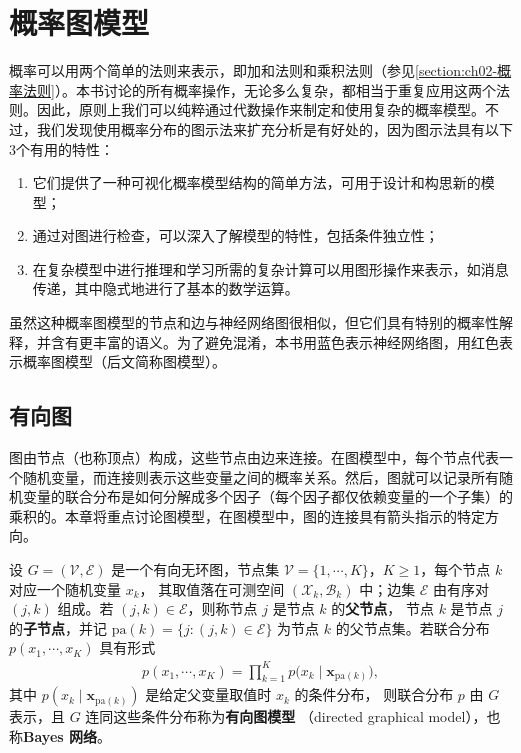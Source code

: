 \documentclass[../../main.tex]{subfiles}
\begin{document}
\section{概率图模型}\label{section:ch11-概率图模型}

概率可以用两个简单的法则来表示，即加和法则和乘积法则（参见\cref{section:ch02-概率法则}）。本书讨论的所有概率操作，无论多么复杂，都相当于重复应用这两个法则。因此，原则上我们可以纯粹通过代数操作来制定和使用复杂的概率模型。不过，我们发现使用概率分布的图示法来扩充分析是有好处的，因为图示法具有以下3个有用的特性：

\begin{enumerate}[(1)]
  \item 它们提供了一种可视化概率模型结构的简单方法，可用于设计和构思新的模型；
  \item 通过对图进行检查，可以深入了解模型的特性，包括条件独立性；
  \item 在复杂模型中进行推理和学习所需的复杂计算可以用图形操作来表示，如消息传递，其中隐式地进行了基本的数学运算。
\end{enumerate}

虽然这种概率图模型的节点和边与神经网络图很相似，但它们具有特别的概率性解释，并含有更丰富的语义。为了避免混淆，本书用蓝色表示神经网络图，用红色表示概率图模型（后文简称图模型）。

\subsection{有向图}\label{subsection:ch11-有向图}

图由节点（也称顶点）构成，这些节点由边来连接。在图模型中，每个节点代表一个随机变量，而连接则表示这些变量之间的概率关系。然后，图就可以记录所有随机变量的联合分布是如何分解成多个因子（每个因子都仅依赖变量的一个子集）的乘积的。本章将重点讨论图模型，在图模型中，图的连接具有箭头指示的特定方向。

\begin{definition}[有向图模型]\label{definition:ch11-有向图模型}
设 $G=(\mathcal{V},\mathcal{E})$ 是一个有向无环图，节点集
$\mathcal{V}=\{1,\cdots,K\}$，$K\geqslant1$，每个节点 $k$ 对应一个随机变量 $x_k$，
其取值落在可测空间 $(\mathcal{X}_k,\mathcal{B}_k)$ 中；边集 $\mathcal{E}$ 由有序对
$(j,k)$ 组成。若 $(j,k)\in\mathcal{E}$，则称节点 $j$ 是节点 $k$ 的\textbf{父节点}，
节点 $k$ 是节点 $j$ 的\textbf{子节点}，并记
$\mathrm{pa}(k)=\{j:(j,k)\in\mathcal{E}\}$ 为节点 $k$ 的父节点集。若联合分布
$p(x_1,\cdots,x_K)$ 具有形式
\begin{align*}
  p(x_1,\cdots,x_K)=\prod_{k=1}^{K}p\bigl(x_k\mid \mathbf{x}_{\mathrm{pa}(k)}\bigr),
\end{align*}
其中 $p(x_k\mid \mathbf{x}_{\mathrm{pa}(k)})$ 是给定父变量取值时 $x_k$ 的条件分布，
则联合分布 $p$ 由 $G$ 表示，且 $G$ 连同这些条件分布称为\textbf{有向图模型}
（directed graphical model），也称\textbf{Bayes 网络}。
\end{definition}
\end{document}
